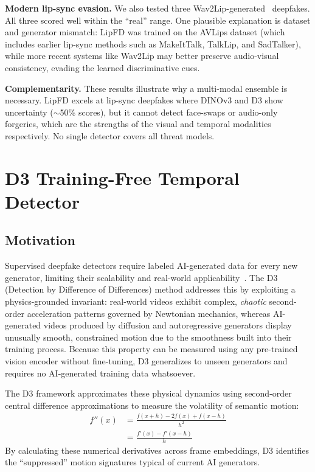 \documentclass[conference]{IEEEtran}
\begin{document}
\smallskip\noindent\textbf{Modern lip-sync evasion.}  We also tested three Wav2Lip-generated~\cite{prajwal2020wav2lip} deepfakes.  All three scored well within the ``real'' range.  One plausible explanation is dataset and generator mismatch: LipFD was trained on the AVLips dataset (which includes earlier lip-sync methods such as MakeItTalk, TalkLip, and SadTalker), while more recent systems like Wav2Lip may better preserve audio-visual consistency, evading the learned discriminative cues.

\smallskip\noindent\textbf{Complementarity.}  These results illustrate why a multi-modal ensemble is necessary.  LipFD excels at lip-sync deepfakes where DINOv3 and D3 show uncertainty (${\sim}$50\% scores), but it cannot detect face-swaps or audio-only forgeries, which are the strengths of the visual and temporal modalities respectively.  No single detector covers all threat models.


\section{D3 Training-Free Temporal Detector} \label{sec:d3}

\subsection{Motivation}
Supervised deepfake detectors require labeled AI-generated data for every new generator, limiting their scalability and real-world applicability~\cite{zheng2025d3}. The D3 (Detection by Difference of Differences) method addresses this by exploiting a physics-grounded invariant: real-world videos exhibit complex, \emph{chaotic} second-order acceleration patterns governed by Newtonian mechanics, whereas AI-generated videos produced by diffusion and autoregressive generators display unusually smooth, constrained motion due to the smoothness built into their training process. Because this property can be measured using any pre-trained vision encoder without fine-tuning, D3 generalizes to unseen generators and requires no AI-generated training data whatsoever.

The D3 framework approximates these physical dynamics using second-order central difference approximations to measure the volatility of semantic motion:
\begin{align}
    f''(x) &= \frac{f(x+h) - 2f(x) + f(x-h)}{h^2} \\
           &= \frac{f'(x) - f'(x-h)}{h}
\end{align}
By calculating these numerical derivatives across frame embeddings, D3 identifies the ``suppressed'' motion signatures typical of current AI generators.
\end{document}
